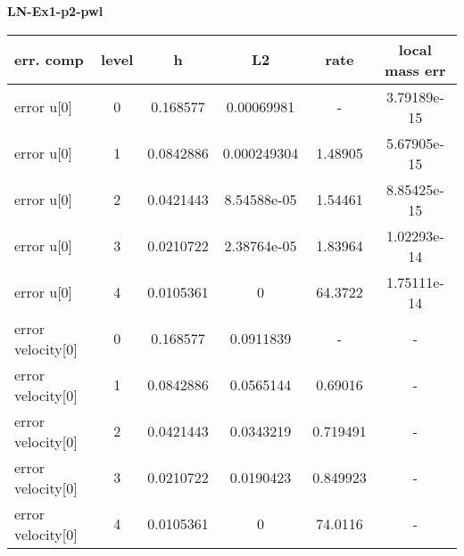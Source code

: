 \documentclass{amsart}
\begin{document}
\begin{center}   
{\bf LN-Ex1-p2-pwl }\end{center}  
\tableofcontents

\begin{table}[h!]
\begin{tabular}{|l|c|c|c|c|c|}
\hline
err. comp & level & h  & L2 & rate  & local mass err \\ 
\hline
error u[0] & 0 & 0.168577  & 0.00069981 & -   &  3.79189e-15 \\ 
error u[0] & 1 & 0.0842886 & 0.000249304 & 1.48905   &  5.67905e-15 \\ 
error u[0] & 2 & 0.0421443 & 8.54588e-05 & 1.54461   &  8.85425e-15 \\ 
error u[0] & 3 & 0.0210722 & 2.38764e-05 & 1.83964   &  1.02293e-14 \\ 
error u[0] & 4 & 0.0105361 & 0 & 64.3722   &  1.75111e-14 \\ 
error velocity[0] & 0 & 0.168577  & 0.0911839 & -   & - \\ 
error velocity[0] & 1 & 0.0842886 & 0.0565144 & 0.69016   & - \\ 
error velocity[0] & 2 & 0.0421443 & 0.0343219 & 0.719491   & - \\ 
error velocity[0] & 3 & 0.0210722 & 0.0190423 & 0.849923   & - \\ 
error velocity[0] & 4 & 0.0105361 & 0 & 74.0116   & - \\ 

\hline
\end{tabular}
\end{table}
\end{document}
